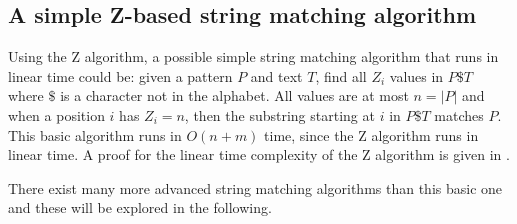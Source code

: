 \subsection{A simple Z-based string matching algorithm}

Using the Z algorithm, a possible simple string matching algorithm that runs in linear time could be: given a pattern $P$ and text $T$, find all $Z_i$ values in $P\$T$ where $\$$ is a character not in the alphabet. All values are at most $n=|P|$ and when a position $i$ has $Z_i=n$, then the substring starting at $i$ in $P\$T$ matches $P$. This basic algorithm runs in $O(n+m)$ time, since the Z algorithm runs in linear time. A proof for the linear time complexity of the Z algorithm is given in \cite{Gusfield1997AlgorithmsOS}. 

There exist many more advanced string matching algorithms than this basic one and these will be explored in the following. 

